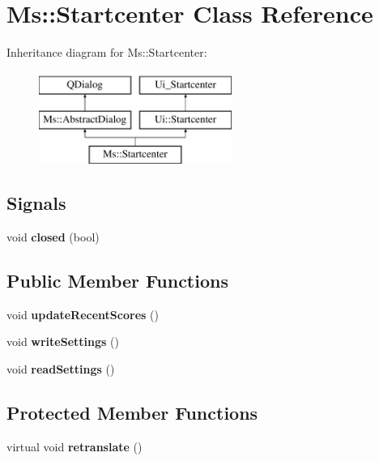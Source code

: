 \hypertarget{class_ms_1_1_startcenter}{}\section{Ms\+:\+:Startcenter Class Reference}
\label{class_ms_1_1_startcenter}
Inheritance diagram for Ms\+:\+:Startcenter\+:\begin{figure}[H]
\begin{center}
\leavevmode
\includegraphics[height=3.000000cm]{class_ms_1_1_startcenter}
\end{center}
\end{figure}
\subsection*{Signals}
\begin{DoxyCompactItemize}
\item 
\mbox{\label{class_ms_1_1_startcenter_a37603daeeb35e8fc443a7b4336e56458}} 
void {\bfseries closed} (bool)
\end{DoxyCompactItemize}
\subsection*{Public Member Functions}
\begin{DoxyCompactItemize}
\item 
\mbox{\label{class_ms_1_1_startcenter_ab6dca868baab14d40eebe6e97b82a28b}} 
void {\bfseries update\+Recent\+Scores} ()
\item 
\mbox{\label{class_ms_1_1_startcenter_a8f292b8b1ccb818a9edce7bed7d8f699}} 
void {\bfseries write\+Settings} ()
\item 
\mbox{\label{class_ms_1_1_startcenter_a82b5cac3696107f47f9fd17a0594da40}} 
void {\bfseries read\+Settings} ()
\end{DoxyCompactItemize}
\subsection*{Protected Member Functions}
\begin{DoxyCompactItemize}
\item 
\mbox{\label{class_ms_1_1_startcenter_a7266d313392ba4fe85776932c576039c}} 
virtual void {\bfseries retranslate} ()
\end{DoxyCompactItemize}
